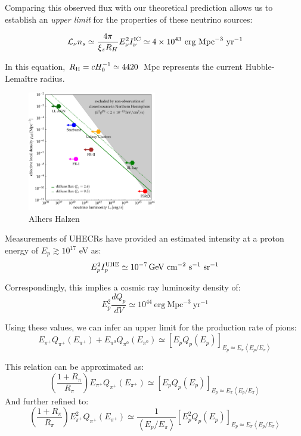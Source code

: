 Comparing this observed flux with our theoretical prediction allows us to establish an \emph{upper limit} for the properties of these neutrino sources:
%
\begin{remark}
\[
\mathcal L_\nu n_s \simeq \frac{4\pi}{\xi_z R_H} E_\nu^2 I^{\rm IC}_\nu \simeq 4 \times 10^{43}~\text{erg}~\text{Mpc}^{-3}~\text{yr}^{-1}  
\]
\end{remark}

In this equation, \(R_{\rm H} = c H_0^{-1} \simeq 4420\)~Mpc represents the current Hubble-Lemaître radius.

\begin{figure}[!t]
\centering
\includegraphics[width=0.5\textwidth]{figures/luminosityDISCOVERY.pdf}
\caption{Alhers Halzen~\cite{Ahlers2018ppnp}}
\end{figure}

Measurements of UHECRs have provided an estimated intensity at a proton energy of \(E_p \gtrsim 10^{17}\) eV as:
%
\[ 
E_p^2 I^{\rm UHE}_p \simeq 10^{-7} \, \text{GeV}~\text{cm}^{-2}~\text{s}^{-1}~\text{sr}^{-1} 
\]

Correspondingly, this implies a cosmic ray luminosity density of:
%
\[ 
E_p^2 \frac{dQ_p}{dV} \simeq 10^{44}~\text{erg}~\text{Mpc}^{-3}~\text{yr}^{-1} 
\]

Using these values, we can infer an upper limit for the production rate of pions:
%
\[
E_{\pi^+} Q_{\pi^+} (E_{\pi^+}) + E_{\pi^0} Q_{\pi^0}(E_{\pi^0}) \simeq \left[E_p Q_p(E_p) \right]_{E_p \simeq E_{\pi} \left\langle {E_p}/{E_{\pi}} \right\rangle}
\]

This relation can be approximated as:
\[
\left(\frac{1 + R_{\pi}}{R_{\pi}} \right) E_{\pi^+} Q_{\pi^+} (E_{\pi^+}) \simeq \left[E_p Q_p(E_p) \right]_{E_p \simeq E_{\pi} \left\langle {E_p}/{E_{\pi}} \right\rangle}
\]
And further refined to:
\[
\left(\frac{1 + R_{\pi}}{R_{\pi}} \right) E^2_{\pi^+} Q_{\pi^+} (E_{\pi^+}) \simeq \frac{1}{\left\langle {E_p}/{E_{\pi}} \right\rangle} \left[E^2_p Q_p(E_p) \right]_{E_p \simeq E_{\pi} \left\langle {E_p}/{E_{\pi}} \right\rangle}
\]

